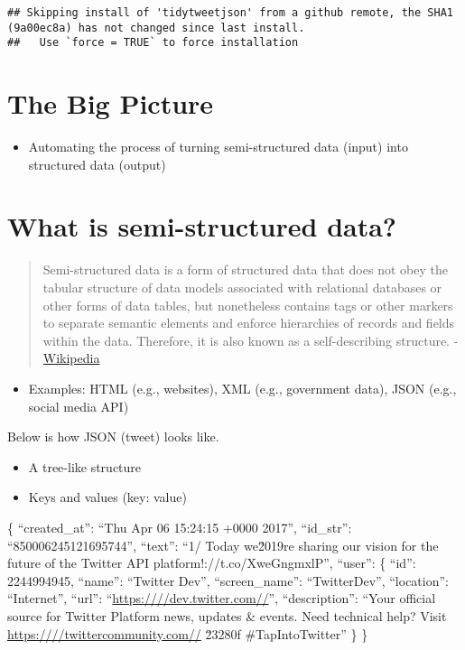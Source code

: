 \documentclass[
]{book}
\providecommand{\tightlist}{%
  \setlength{\itemsep}{0pt}\setlength{\parskip}{0pt}}
\begin{document}
\begin{verbatim}
## Skipping install of 'tidytweetjson' from a github remote, the SHA1 (9a00ec8a) has not changed since last install.
##   Use `force = TRUE` to force installation
\end{verbatim}

\hypertarget{the-big-picture-7}{%
\section{The Big Picture}\label{the-big-picture-7}}

\begin{itemize}
\tightlist
\item
  Automating the process of turning semi-structured data (input) into structured data (output)
\end{itemize}

\hypertarget{what-is-semi-structured-data}{%
\section{What is semi-structured data?}\label{what-is-semi-structured-data}}

\begin{quote}
Semi-structured data is a form of structured data that does not obey the tabular structure of data models associated with relational databases or other forms of data tables, but nonetheless contains tags or other markers to separate semantic elements and enforce hierarchies of records and fields within the data. Therefore, it is also known as a self-describing structure. - \href{https://en.wikipedia.org/wiki/Semi-structured_data\#:~:text=Semi\%2Dstructured\%20data\%20is\%20a,and\%20fields\%20within\%20the\%20data.}{Wikipedia}
\end{quote}

\begin{itemize}
\tightlist
\item
  Examples: HTML (e.g., websites), XML (e.g., government data), JSON (e.g., social media API)
\end{itemize}

Below is how JSON (tweet) looks like.

\begin{itemize}
\item
  A tree-like structure
\item
  Keys and values (key: value)
\end{itemize}

\{
``created\_at'': ``Thu Apr 06 15:24:15 +0000 2017'',
``id\_str'': ``850006245121695744'',
``text'': ``1/ Today we\u2019re sharing our vision for the future of the Twitter API platform!\nhttps://t.co/XweGngmxlP'',
``user'': \{
``id'': 2244994945,
``name'': ``Twitter Dev'',
``screen\_name'': ``TwitterDev'',
``location'': ``Internet'',
``url'': ``\url{https:////dev.twitter.com//}'',
``description'': ``Your official source for Twitter Platform news, updates \& events. Need technical help? Visit \url{https:////twittercommunity.com//} \u2328\ufe0f \#TapIntoTwitter''
\}
\}
\end{document}
